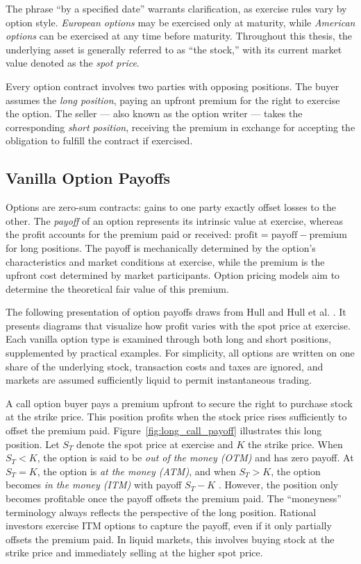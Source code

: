 \documentclass[english,12pt,a4paper,pdftex,sci,utf8]{aaltothesis}
\begin{document}
The phrase ``by a specified date'' warrants clarification, as exercise rules vary by option style. \emph{European options} may be exercised only at maturity, while \emph{American options} can be exercised at any time before maturity. Throughout this thesis, the underlying asset is generally referred to as ``the stock,'' with its current market value denoted as the \emph{spot price}.

Every option contract involves two parties with opposing positions. The buyer assumes the \emph{long position}, paying an upfront premium for the right to exercise the option. The seller --- also known as the option writer --- takes the corresponding \emph{short position}, receiving the premium in exchange for accepting the obligation to fulfill the contract if exercised.

\clearpage
\subsection{Vanilla Option Payoffs}\label{subsec:payoffs}

Options are zero-sum contracts: gains to one party exactly offset losses to the other. The \emph{payoff} of an option represents its intrinsic value at exercise, whereas the profit accounts for the premium paid or received: \mbox{$\text{profit} = \text{payoff} - \text{premium}$} for long positions. The payoff is mechanically determined by the option's characteristics and market conditions at exercise, while the premium is the upfront cost determined by market participants. Option pricing models aim to determine the theoretical fair value of this premium.

The following presentation of option payoffs draws from Hull \cite{hull2016options} and Hull et al. \cite{hull2013fundamentals}. It presents diagrams that visualize how profit varies with the spot price at exercise. Each vanilla option type is examined through both long and short positions, supplemented by practical examples. For simplicity, all options are written on one share of the underlying stock, transaction costs and taxes are ignored, and markets are assumed sufficiently liquid to permit instantaneous trading.

A call option buyer pays a premium upfront to secure the right to purchase stock at the strike price. This position profits when the stock price rises sufficiently to offset the premium paid. Figure~\ref{fig:long_call_payoff} illustrates this long position. Let $S_T$ denote the spot price at exercise and $K$ the strike price. When $S_T < K$, the option is said to be \emph{out of the money (OTM)} and has zero payoff. At $S_T = K$, the option is \emph{at the money (ATM)}, and when $S_T > K$, the option becomes \emph{in the money (ITM)} with payoff $S_T - K$ \cite{hull2013fundamentals}. However, the position only becomes profitable once the payoff offsets the premium paid. The ``moneyness'' terminology always reflects the perspective of the long position. Rational investors exercise ITM options to capture the payoff, even if it only partially offsets the premium paid. In liquid markets, this involves buying stock at the strike price and immediately selling at the higher spot price.
\end{document}
